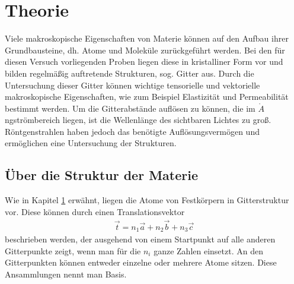 

\section{Theorie}\label{sec:theorie}
Viele makroskopische Eigenschaften von Materie können auf den Aufbau ihrer Grundbausteine, dh. Atome und Moleküle zurückgeführt werden. Bei den für diesen Versuch vorliegenden Proben liegen diese in kristalliner Form vor und bilden regelmäßig auftretende Strukturen, sog. Gitter aus. Durch die Untersuchung dieser Gitter können wichtige tensorielle und vektorielle makroskopische Eigenschaften, wie zum Beispiel Elastizität und Permeabilität bestimmt werden. Um die Gitterabstände auflösen zu können, die im $\mathring{A}$ngströmbereich liegen, ist die Wellenlänge des sichtbaren Lichtes zu groß. Röntgenstrahlen haben jedoch das benötigte Auflösungsvermögen und ermöglichen eine Untersuchung der Strukturen.

\subsection{Über die Struktur der Materie}
Wie in Kapitel \ref{sec:theorie} erwähnt, liegen die Atome von Festkörpern in Gitterstruktur vor. Diese können durch einen Translationsvektor
\begin{align}
	\vec{t} = n_1\vec{a} +n_2\vec{b} + n_3\vec{c}
\end{align}
beschrieben werden, der ausgehend von einem Startpunkt auf alle anderen Gitterpunkte zeigt, wenn man für die $n_i$ ganze Zahlen einsetzt. An den Gitterpunkten können entweder einzelne oder mehrere Atome sitzen. Diese Ansammlungen nennt man Basis. 

